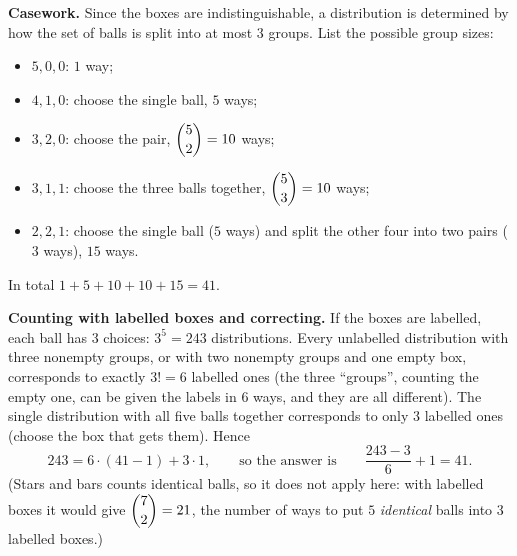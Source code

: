 \textbf{Casework.} Since the boxes are indistinguishable, a distribution is determined by how the set of balls is split into at most $3$ groups. List the possible group sizes:
\begin{itemize}
\item $5,0,0$: $1$ way;
\item $4,1,0$: choose the single ball, $5$ ways;
\item $3,2,0$: choose the pair, $\dbinom52=10$ ways;
\item $3,1,1$: choose the three balls together, $\dbinom53=10$ ways;
\item $2,2,1$: choose the single ball ($5$ ways) and split the other four into two pairs ($3$ ways), $15$ ways.
\end{itemize}
In total $1+5+10+10+15=\boxed{41}$.

\textbf{Counting with labelled boxes and correcting.} If the boxes are labelled, each ball has $3$ choices: $3^5=243$ distributions. Every unlabelled distribution with three nonempty groups, or with two nonempty groups and one empty box, corresponds to exactly $3!=6$ labelled ones (the three ``groups'', counting the empty one, can be given the labels in $6$ ways, and they are all different). The single distribution with all five balls together corresponds to only $3$ labelled ones (choose the box that gets them). Hence
\[243=6\cdot(41-1)+3\cdot1,\qquad\text{so the answer is}\qquad\dfrac{243-3}{6}+1=41.\]
(Stars and bars counts identical balls, so it does not apply here: with labelled boxes it would give $\dbinom72=21$, the number of ways to put $5$ \emph{identical} balls into $3$ labelled boxes.)
